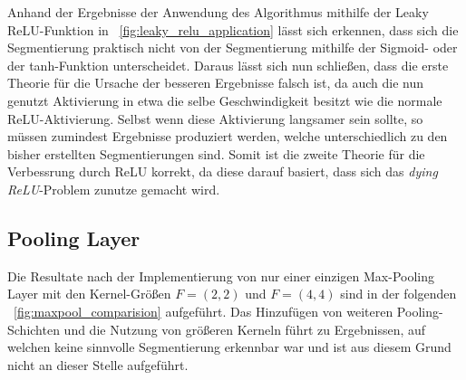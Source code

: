 Anhand der Ergebnisse der Anwendung des Algorithmus mithilfe der Leaky ReLU-Funktion in \figurename~\ref{fig:leaky_relu_application} lässt sich erkennen, dass sich die Segmentierung praktisch nicht von der Segmentierung mithilfe der Sigmoid- oder der tanh-Funktion unterscheidet. Daraus lässt sich nun schließen, dass die erste Theorie für die Ursache der besseren Ergebnisse falsch ist, da auch die nun genutzt Aktivierung in etwa die selbe Geschwindigkeit besitzt wie die normale ReLU-Aktivierung. Selbst wenn diese Aktivierung langsamer sein sollte, so müssen zumindest Ergebnisse produziert werden, welche unterschiedlich zu den bisher erstellten Segmentierungen sind. Somit ist die zweite Theorie für die Verbessrung durch ReLU korrekt, da diese darauf basiert, dass sich das \textit{dying ReLU}-Problem zunutze gemacht wird.

\subsection{Pooling Layer}
\label{ssec:exp_architecture_pooling}

Die Resultate nach der Implementierung von nur einer einzigen Max-Pooling Layer mit den Kernel-Größen $F=(2, 2)$ und $F=(4, 4)$ sind in der folgenden \figurename~\ref{fig:maxpool_comparision} aufgeführt. Das Hinzufügen von weiteren Pooling-Schichten und die Nutzung von größeren Kerneln führt zu Ergebnissen, auf welchen keine sinnvolle Segmentierung erkennbar war und ist aus diesem Grund nicht an dieser Stelle aufgeführt.


